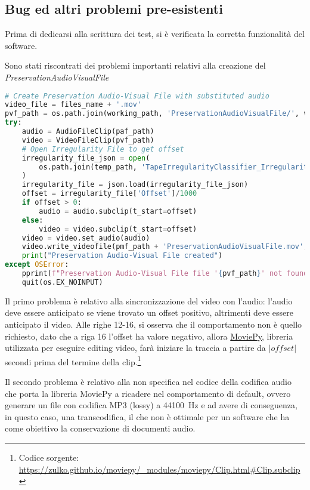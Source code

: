 \subsection{Bug ed altri problemi pre-esistenti}    %
Prima di dedicarsi alla scrittura dei test, si è verificata la corretta funzionalità del software.

Sono stati riscontrati dei problemi importanti relativi alla creazione del \textit{PreservationAudioVisualFile}

\begin{lstlisting}[language=Python, caption=Codice iniziale; creazione PreservationAudioVisualFile]
# Create Preservation Audio-Visual File with substituted audio
video_file = files_name + '.mov'
pvf_path = os.path.join(working_path, 'PreservationAudioVisualFile/', video_file)
try:
    audio = AudioFileClip(paf_path)
    video = VideoFileClip(pvf_path)
    # Open Irregularity File to get offset
    irregularity_file_json = open(
        os.path.join(temp_path, 'TapeIrregularityClassifier_IrregularityFileOutput2.json')
    )
    irregularity_file = json.load(irregularity_file_json)
    offset = irregularity_file['Offset']/1000
    if offset > 0:
        audio = audio.subclip(t_start=offset)
    else:
        video = video.subclip(t_start=offset)
    video = video.set_audio(audio)
    video.write_videofile(pmf_path + 'PreservationAudioVisualFile.mov', bitrate='3000k', codec='mpeg4')
    print("Preservation Audio-Visual File created")
except OSError:
    pprint(f"Preservation Audio-Visual File file '{pvf_path}' not found!", color=Color.RED)
    quit(os.EX_NOINPUT)
\end{lstlisting}

Il primo problema è relativo alla sincronizzazione del video con l'audio: l'audio deve essere anticipato se viene trovato un offset positivo, altrimenti deve essere anticipato il video.
Alle righe 12-16, si osserva che il comportamento non è quello richiesto, dato che a riga 16 l'offset ha valore negativo, allora \href{https://zulko.github.io/moviepy/}{MoviePy}, libreria utilizzata per eseguire editing video, farà iniziare la traccia a partire da $|offset|$ secondi prima del termine della clip.\footnote{Codice sorgente: \url{https://zulko.github.io/moviepy/_modules/moviepy/Clip.html#Clip.subclip}}    %

Il secondo problema è relativo alla non specifica nel codice della codifica audio che porta la libreria MoviePy a ricadere nel comportamento di default, ovvero generare un file con codifica MP3 (lossy) a \qty{44100}{\Hz} e ad avere di conseguenza, in questo caso, una transcodifica, il che non è ottimale per un software che ha come obiettivo la conservazione di documenti audio.

